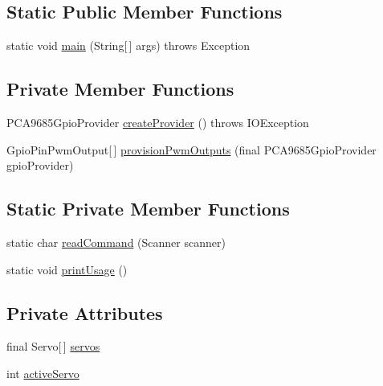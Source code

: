 \subsection*{Static Public Member Functions}
\begin{DoxyCompactItemize}
\item 
static void \hyperlink{classcom_1_1pi4j_1_1examples_1_1PCA9685GpioServoExample_a310ab500cb4a07eb36d212c03f785919}{main} (String\mbox{[}$\,$\mbox{]} args)  throws Exception 
\end{DoxyCompactItemize}
\subsection*{Private Member Functions}
\begin{DoxyCompactItemize}
\item 
P\+C\+A9685\+Gpio\+Provider \hyperlink{classcom_1_1pi4j_1_1examples_1_1PCA9685GpioServoExample_a8850e11e49a6f74dcdbff59b21138fe0}{create\+Provider} ()  throws I\+O\+Exception 
\item 
Gpio\+Pin\+Pwm\+Output\mbox{[}$\,$\mbox{]} \hyperlink{classcom_1_1pi4j_1_1examples_1_1PCA9685GpioServoExample_ab65da424fb1726e0a5f7b845d7c90db4}{provision\+Pwm\+Outputs} (final P\+C\+A9685\+Gpio\+Provider gpio\+Provider)
\end{DoxyCompactItemize}
\subsection*{Static Private Member Functions}
\begin{DoxyCompactItemize}
\item 
static char \hyperlink{classcom_1_1pi4j_1_1examples_1_1PCA9685GpioServoExample_a167992c1751751516977ae53ec98b4f7}{read\+Command} (Scanner scanner)
\item 
static void \hyperlink{classcom_1_1pi4j_1_1examples_1_1PCA9685GpioServoExample_a076bc613443d5674a60ca0d6d617c639}{print\+Usage} ()
\end{DoxyCompactItemize}
\subsection*{Private Attributes}
\begin{DoxyCompactItemize}
\item 
final Servo\mbox{[}$\,$\mbox{]} \hyperlink{classcom_1_1pi4j_1_1examples_1_1PCA9685GpioServoExample_a622c917f952918d53b7ea916352659d8}{servos}
\item 
int \hyperlink{classcom_1_1pi4j_1_1examples_1_1PCA9685GpioServoExample_ad9fc8f0c57cb26d4ec2639aec1046f07}{active\+Servo}
\end{DoxyCompactItemize}
